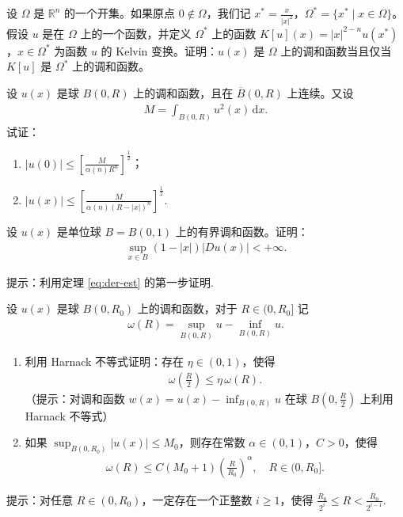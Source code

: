 \documentclass[../../main.tex]{subfiles}%
\begin{document}
\begin{example}
设 $\Omega$ 是 $\mathbb{R}^n$ 的一个开集。如果原点 $0\notin\Omega$，我们记 $x^*=\frac{x}{|x|^2}$，$\Omega^*=\{x^* \mid x\in\Omega\}$。假设 $u$ 是在 $\Omega$ 上的一个函数，并定义 $\Omega^*$ 上的函数 $K[u](x)=|x|^{2-n}u(x^*)$，$x\in\Omega^*$ 为函数 $u$ 的 Kelvin 变换。证明：$u(x)$ 是 $\Omega$ 上的调和函数当且仅当 $K[u]$ 是 $\Omega^*$ 上的调和函数。
\end{example}

\begin{example}
设 $u(x)$ 是球 $B(0,R)$ 上的调和函数，且在 $\overline{B}(0,R)$ 上连续。又设
\begin{align*}
M = \int_{B(0,R)} u^2(x)\,\mathrm{d}x.
\end{align*}
试证：
\begin{enumerate}[(1)]
\item $\displaystyle |u(0)| \leqslant \left[ \frac{M}{\alpha(n)R^n} \right]^{\frac{1}{2}}$；
\item $\displaystyle |u(x)| \leqslant \left[ \frac{M}{\alpha(n)(R-|x|)^n} \right]^{\frac{1}{2}}$.
\end{enumerate}
\end{example}

\begin{example}
设 $u(x)$ 是单位球 $B=B(0,1)$ 上的有界调和函数。证明：
\begin{align*}
\sup_{x\in B} (1-|x|)|Du(x)| < +\infty.
\end{align*}
\end{example}
\begin{note}
提示：利用定理 \eqref{eq:der-est} 的第一步证明.
\end{note}

\begin{example}
设 $u(x)$ 是球 $B(0,R_0)$ 上的调和函数，对于 $R\in(0,R_0]$ 记
\begin{align*}
\omega(R) = \sup_{B(0,R)} u - \inf_{B(0,R)} u.
\end{align*}
\begin{enumerate}[(1)]
\item 利用 Harnack 不等式证明：存在 $\eta\in(0,1)$，使得
\begin{align*}
\omega\left(\frac{R}{2}\right) \leqslant \eta\,\omega(R).
\end{align*}
（提示：对调和函数 $w(x)=u(x)-\inf_{B(0,R)}u$ 在球 $B(0,\frac{R}{2})$ 上利用 Harnack 不等式）
\item 如果 $\sup_{B(0,R_0)} |u(x)| \leqslant M_0$，则存在常数 $\alpha\in(0,1)$，$C>0$，使得
\begin{align*}
\omega(R) \leqslant C(M_0+1)\left(\frac{R}{R_0}\right)^\alpha,\quad R\in(0,R_0].
\end{align*}
\end{enumerate}
\end{example}
\begin{note}
提示：对任意 $R\in(0,R_0)$，一定存在一个正整数 $i\geqslant 1$，使得 $\frac{R_0}{2^i}\leqslant R < \frac{R_0}{2^{i-1}}$.
\end{note}
\end{document}
